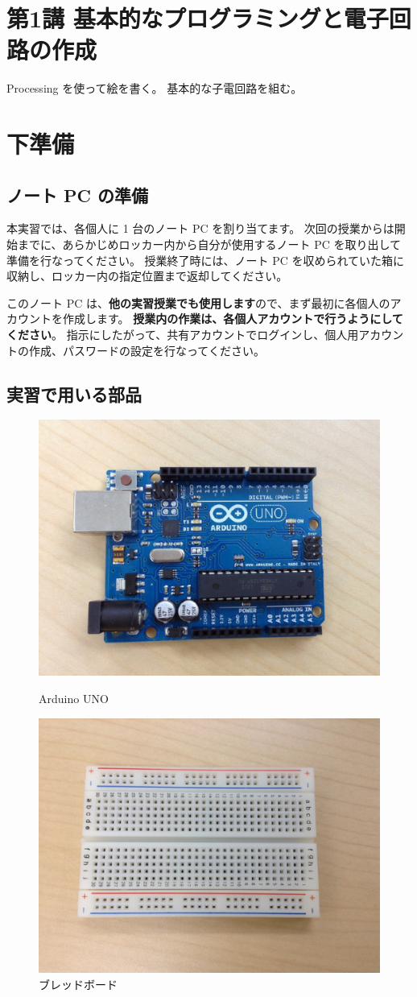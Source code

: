 \documentclass[11pt,a4paper]{jarticle}
\begin{document}
\section*{\LARGE{第1講 基本的なプログラミングと電子回路の作成}}
Processing を使って絵を書く。
基本的な子電回路を組む。



\section{下準備}
\subsection*{ノート PC の準備}
本実習では、各個人に 1 台のノート PC を割り当てます。
次回の授業からは開始までに、あらかじめロッカー内から自分が使用するノート PC を取り出して準備を行なってください。
授業終了時には、ノート PC を収められていた箱に収納し、ロッカー内の指定位置まで返却してください。

このノート PC は、\textbf{他の実習授業でも使用します}ので、まず最初に各個人のアカウントを作成します。
\textbf{授業内の作業は、各個人アカウントで行うようにしてください}。
指示にしたがって、共有アカウントでログインし、個人用アカウントの作成、パスワードの設定を行なってください。

\subsection*{実習で用いる部品}
\begin{figure}[h!]
 \begin{minipage}{0.5\columnwidth}
  \centering
  \includegraphics[height=0.4\columnwidth]{img/arduino.eps}
  \caption{Arduino UNO}
 \end{minipage}
 \begin{minipage}{0.5\columnwidth}
  \centering
  \includegraphics[height=0.4\columnwidth]{img/breadboard.eps}
  \caption{ブレッドボード}
 \end{minipage}
\end{figure}
\end{document}
